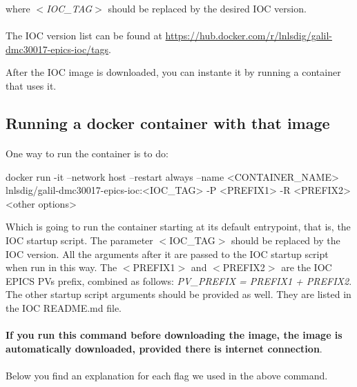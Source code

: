 \documentclass[openany]{article}
\begin{document}
        where \emph{$<$IOC\_TAG$>$} should be replaced by the desired IOC version.

        \paragraph{} The IOC version list can be found at \url{https://hub.docker.com/r/lnlsdig/galil-dmc30017-epics-ioc/tags}.

        After the IOC image is downloaded, you can instante it by running a container that uses it.

    \subsection{Running a docker container with that image}

        \paragraph{} One way to run the container is to do:

        \vspace{1mm}
        \begin{code}
docker run -it --network host --restart always --name <CONTAINER_NAME> lnlsdig/galil-dmc30017-epics-ioc:<IOC_TAG> -P <PREFIX1> -R <PREFIX2> <other options>
        \end{code}
        \vspace{1mm}

        Which is going to run the container starting at its default entrypoint, that is, the IOC startup script. The parameter $<$IOC\_TAG$>$ should be replaced by the IOC version. All the arguments after it are passed to the IOC startup script when run in this way. The $<$PREFIX1$>$ and $<$PREFIX2$>$ are the IOC EPICS PVs prefix, combined as follows: \emph{PV\_PREFIX = PREFIX1 + PREFIX2}. The other startup script arguments should be provided as well. They are listed in the IOC README.md file.

        \paragraph{} \textbf{If you run this command before downloading the image, the image is automatically downloaded, provided there is internet connection}.

        \paragraph{} Below you find an explanation for each flag we used in the above command.
\end{document}
